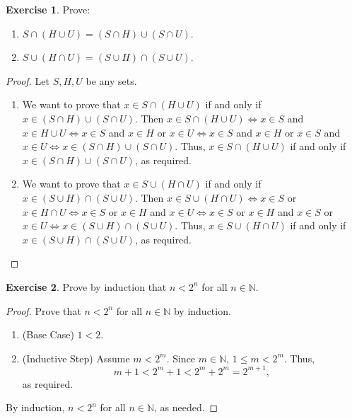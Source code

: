 \documentclass[12pt]{article}
\theoremstyle{definition}
\newtheorem{exercise}{Exercise}
\begin{document}
\thispagestyle{firstpage}

\begin{exercise}
    Prove:
    \begin{enumerate}[label=\alph*)]
        \item $S \cap (H \cup U) = (S \cap H) \cup (S \cap U)$.
        \item $S \cup (H \cap U) = (S \cup H) \cap (S \cup U)$.
    \end{enumerate}
\end{exercise}

\begin{proof}
    Let $S,H,U$ be any sets.
    \begin{enumerate}[label=\alph*)]
        \item We want to prove that $x \in S \cap (H \cup U)$ if and only if $x \in (S \cap H) \cup (S \cap U)$. Then $x \in S \cap (H \cup U) \iff x \in S$ and $x \in H \cup U \iff x \in S$ and $x \in H$ or $x \in U \iff x \in S$ and $x \in H$ or $x \in S$ and $x \in U \iff x \in (S \cap H) \cup (S \cap U)$. Thus, $x \in S \cap (H \cup U)$ if and only if $x \in (S \cap H) \cup (S \cap U)$, as required.
        \item We want to prove that $x \in S \cup (H \cap U)$ if and only if $x \in (S \cup H) \cap (S \cup U)$. Then $x \in S \cup (H \cap U) \iff x \in S$ or $x \in H \cap U \iff x \in S$ or $x \in H$ and $x \in U \iff x \in S$ or $x \in H$ and $x \in S$ or $x \in U \iff x \in (S \cup H) \cap (S \cup U)$. Thus, $x \in S \cup (H \cap U)$ if and only if $x \in (S \cup H) \cap (S \cup U)$, as required.
    \end{enumerate}
\end{proof}

\begin{exercise}
    Prove by induction that $n < 2^n$ for all $n \in \mathbb{N}$.
\end{exercise}

\begin{proof}
    Prove that $n < 2^n$ for all $n \in \mathbb{N}$ by induction.
    \begin{enumerate}[label=\arabic*)]
        \item (Base Case) $1 < 2$.
        \item (Inductive Step) Assume $m < 2^m$. Since $m \in \mathbb{N}$, $1 \leq m < 2^m$. Thus,
        \[
            m + 1 < 2^m + 1 < 2^m + 2^m = 2^{m + 1},
        \]
        as required.
    \end{enumerate}
    By induction, $n < 2^n$ for all $n \in \mathbb{N}$, as needed.
\end{proof}
\end{document}
